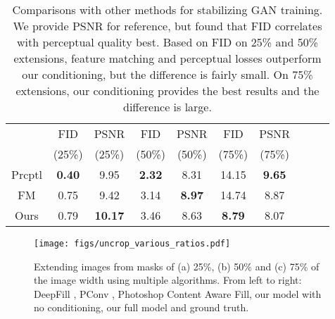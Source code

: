 \begin{table}[tp]
\small
\setlength{\tabcolsep}{2pt}
\centering
\begin{tabular}{|c|c|c|c|c|c|c|c|c|c|}
\hline
  & FID & PSNR & FID & PSNR & FID & PSNR \\
& (25\%) & (25\%) & (50\%) & (50\%) & (75\%) & (75\%) \\
\hline
\hline
Prcptl & \textbf{0.40} &  9.95 & \textbf{2.32} & 8.31 & 14.15 & \textbf{9.65}  \\
FM & 0.75 &  9.42 & 3.14 & \textbf{8.97} & 14.74 & 8.87  \\
Ours & 0.79 & \textbf{10.17} & 3.46 & 8.63 & \textbf{8.79} & 8.07 \\
\hline
\end{tabular}
\vspace{4pt}
\caption{Comparisons with other methods for stabilizing GAN training. We provide PSNR for reference, but found that FID correlates with perceptual quality best. Based on FID on 25\% and 50\% extensions, feature matching and perceptual losses outperform our conditioning, but the difference is fairly small. On 75\% extensions, our conditioning provides the best results and the difference is large. }
\label{exp:table_fm_prcptl}
\end{table}

\begin{figure*}
	\centering
    \hspace{-10pt}\texttt{[image: figs/uncrop\_various\_ratios.pdf]}
    \caption{Extending images from masks of  (a) 25\%,  (b) 50\% and (c) 75\% of the image width using multiple algorithms. From left to right: DeepFill \cite{yu2018generative}, PConv \cite{liu2018partialinpainting}, Photoshop Content Aware Fill, our model with no conditioning, our full model and ground truth.}    
    \label{fig:uncrop_various_masks}
\end{figure*}

